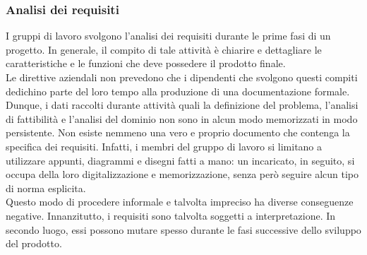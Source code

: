 			\subsubsection{Analisi dei requisiti}
				I gruppi di lavoro svolgono l'analisi dei requisiti durante le prime fasi di un progetto. In generale, il compito di
				tale attività è chiarire e dettagliare le caratteristiche e le funzioni che deve possedere il prodotto
				finale.\\
				Le direttive aziendali non prevedono che i dipendenti che svolgono questi compiti dedichino parte del loro tempo alla
				produzione di una documentazione formale. Dunque, i dati raccolti durante attività quali la definizione del
				problema, l'analisi di fattibilità e l'analisi del dominio non sono in alcun modo memorizzati in modo persistente.
				Non esiste nemmeno una vero e proprio documento che contenga la specifica dei requisiti. Infatti, i membri del
				gruppo di lavoro si limitano a utilizzare appunti, diagrammi e disegni fatti a mano: un incaricato, in seguito, si
				occupa della loro digitalizzazione e memorizzazione, senza però seguire alcun tipo di norma esplicita.\\
				Questo modo di procedere informale e talvolta impreciso ha diverse conseguenze negative. Innanzitutto, i requisiti
				sono  talvolta soggetti a interpretazione. In secondo luogo, essi possono mutare spesso durante le fasi successive
				dello sviluppo del prodotto.
